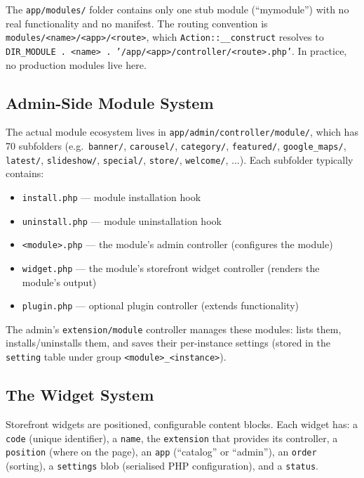 \documentclass[11pt,a4paper]{article}
\begin{document}
The \texttt{app/modules/} folder contains only one stub module
(``mymodule'') with no real functionality and no manifest. The
routing convention is \texttt{modules/<name>/<app>/<route>}, which
\texttt{Action::\_\_construct} resolves to
\texttt{DIR\_MODULE . <name> . '/app/<app>/controller/<route>.php'}.
In practice, no production modules live here.

\subsection{Admin-Side Module System}

The actual module ecosystem lives in
\texttt{app/admin/controller/module/}, which has 70 subfolders
(e.g.\ \texttt{banner/}, \texttt{carousel/}, \texttt{category/},
\texttt{featured/}, \texttt{google\_maps/}, \texttt{latest/},
\texttt{slideshow/}, \texttt{special/}, \texttt{store/},
\texttt{welcome/}, ...). Each subfolder typically contains:

\begin{itemize}[leftmargin=1.6em,itemsep=2pt]
  \item \texttt{install.php} --- module installation hook
  \item \texttt{uninstall.php} --- module uninstallation hook
  \item \texttt{<module>.php} --- the module's admin controller
        (configures the module)
  \item \texttt{widget.php} --- the module's storefront widget
        controller (renders the module's output)
  \item \texttt{plugin.php} --- optional plugin controller (extends
        functionality)
\end{itemize}

The admin's \texttt{extension/module} controller manages these
modules: lists them, installs/uninstalls them, and saves their
per-instance settings (stored in the \texttt{setting} table under
group \texttt{<module>\_<instance>}).

\subsection{The Widget System}

Storefront widgets are positioned, configurable content blocks.
Each widget has: a \texttt{code} (unique identifier), a
\texttt{name}, the \texttt{extension} that provides its controller,
a \texttt{position} (where on the page), an \texttt{app}
(``catalog'' or ``admin''), an \texttt{order} (sorting), a
\texttt{settings} blob (serialised PHP configuration), and a
\texttt{status}.
\end{document}
